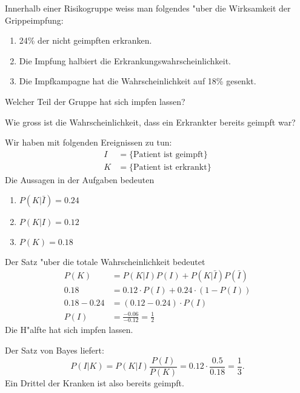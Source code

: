 Innerhalb einer Risiko\-gruppe weiss man folgendes "uber die Wirksamkeit
der Grippe\-impfung:
\begin{enumerate}
\item 24\% der nicht geimpften erkranken.
\item Die Impfung halbiert die Erkrankungswahrscheinlichkeit.
\item Die Impfkampagne hat die Wahrscheinlichkeit
auf 18\% gesenkt.
\end{enumerate}
\begin{teilaufgaben}
\item Welcher Teil der Gruppe hat sich impfen lassen?
\item Wie gross ist die Wahrscheinlichkeit, dass ein Erkrankter
bereits geimpft war?
\end{teilaufgaben}

\begin{loesung}
Wir haben mit folgenden Ereignissen zu tun:
\begin{align*}
I&=\{\text{Patient ist geimpft}\}\\
K&=\{\text{Patient ist erkrankt}\}
\end{align*}
Die Aussagen in der Aufgaben bedeuten
\begin{enumerate}
\item $P(K|\bar I)=0.24$
\item $P(K|I)=0.12$
\item $P(K)=0.18$
\end{enumerate}
\begin{teilaufgaben}
\item
Der Satz "uber die totale Wahrscheinlichkeit bedeutet
\begin{align*}
P(K)&=P(K|I)P(I)+P(K|\bar I)P(\bar I)
\\
0.18&=0.12\cdot P(I)+0.24\cdot (1-P(I))
\\
0.18-0.24&=(0.12-0.24)\cdot P(I)
\\
P(I)&=\frac{-0.06}{-0.12}=\frac12
\end{align*}
Die H"alfte hat sich impfen lassen.
\item
Der Satz von Bayes liefert:
\[
P(I|K)=P(K|I)\frac{P(I)}{P(K)}=0.12\cdot\frac{0.5}{0.18}=\frac13.
\]
Ein Drittel der Kranken ist also bereits geimpft.
\end{teilaufgaben}
\end{loesung}

